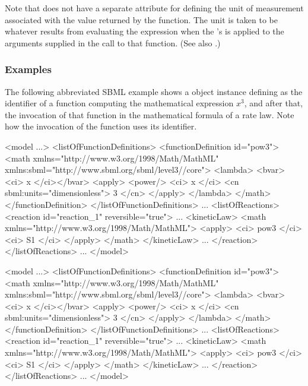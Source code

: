 Note that \FunctionDefinition does not have a separate attribute
for defining the unit of measurement associated with the value
returned by the function.  The unit is taken to be whatever
results from evaluating the expression when the
\FunctionDefinition's  is applied to the arguments
supplied in the call to that function.  (See also
.)


\subsubsection{Examples}

The following abbreviated SBML example shows a \FunctionDefinition
object instance defining  as the identifier of a function
computing the mathematical expression $x^{3}$, and after that, the
invocation of that function in the mathematical formula of a rate
law.  Note how the invocation of the function uses its identifier.

\ifveronespec
\begin{example}
<model ...>
   <listOfFunctionDefinitions>
       <functionDefinition id="pow3">
           <math xmlns="http://www.w3.org/1998/Math/MathML"
                 xmlns:sbml="http://www.sbml.org/sbml/level3/\thisvlc/core">
               <lambda>
                   <bvar><ci> x </ci></bvar>
                   <apply>
                       <power/>
                       <ci> x </ci>
                       <cn sbml:units="dimensionless"> 3 </cn> 
                   </apply>
               </lambda>
           </math>
       </functionDefinition>
   </listOfFunctionDefinitions>
   ...
   <listOfReactions>
       <reaction id="reaction_1" reversible="true">
           ...
           <kineticLaw>
               <math xmlns="http://www.w3.org/1998/Math/MathML">
                   <apply> 
                       <ci> pow3 </ci>
                       <ci> S1 </ci> 
                   </apply>
               </math>
           </kineticLaw>
           ...
       </reaction>
   </listOfReactions>
   ...
</model>\end{example}
\else
\begin{example}
<model ...>
   <listOfFunctionDefinitions>
       <functionDefinition id="pow3">
           <math xmlns="http://www.w3.org/1998/Math/MathML"
                 xmlns:sbml="http://www.sbml.org/sbml/level3/\thisvlc/core">
               <lambda>
                   <bvar><ci> x </ci></bvar>
                   <apply> <power/> <ci> x </ci> <cn sbml:units="dimensionless"> 3 </cn> 
                   </apply>
               </lambda>
           </math>
       </functionDefinition>
   </listOfFunctionDefinitions>
   ...
   <listOfReactions>
       <reaction id="reaction_1" reversible="true">
           ...
           <kineticLaw>
               <math xmlns="http://www.w3.org/1998/Math/MathML">
                   <apply> <ci> pow3 </ci> <ci> S1 </ci> 
                   </apply>
               </math>
           </kineticLaw>
           ...
       </reaction>
   </listOfReactions>
   ...
</model>\end{example}
\fi

